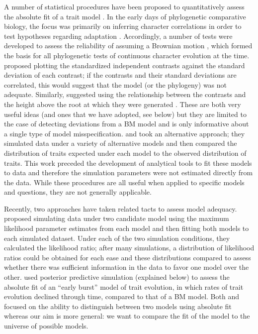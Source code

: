 \documentclass[a4paper,11pt]{article}
\begin{document}
A number of statistical procedures have been proposed to quantitatively assess the absolute fit of a trait model \citep[e.g.,][]{Garland1992, Garland1993, Purvis1995, Diaz1996, FreckletonHarvey2006, Boettiger2012, SlaterPennell, Beaulieu2013, Blackmon2014}. 
In the early days of phylogenetic comparative biology, the focus was primarily on inferring character correlations in order to test hypotheses regarding adaptation \citep[e.g.,][]{Felsenstein1985, Grafen1989, HarveyPagel1991}. Accordingly, a number of tests were developed to assess the reliability of assuming a Brownian motion \citep[BM;][]{Edwards1964, Felsenstein1973, Thompson1975}, which formed the basis for all phylogenetic tests of continuous character evolution at the time. \citet{Garland1992} proposed plotting the standardized independent contrasts \citep[\emph{sensu}][]{Felsenstein1985} against the standard deviation of each contrast; if the contrasts and their standard deviations are correlated, this would suggest that the model (or the phylogeny) was not adequate. Similarly, \citet{Purvis1995} suggested using the relationship between the contrasts and the height above the root at which they were generated \citep[see also][for a slight modification of this test]{FreckletonHarvey2006}. These are both very useful ideas (and ones that we have adopted, see below) but they are limited to the case of detecting deviations from a BM model and is only informative about a single type of model misspecification. \citet{Garland1993} and \citet{Diaz1996} took an alternative approach; they simulated data under a variety of alternative models and then compared the distribution of traits expected under each model to the observed distribution of traits. This work preceded the development of analytical tools to fit these models to data and therefore the simulation parameters were not estimated directly from the data. While these procedures are all useful when applied to specific models and questions, they are not generally applicable.

Recently, two approaches have taken related tacts to assess model adequacy. \citet{Boettiger2012} proposed simulating data under two candidate model using the maximum likelihood parameter estimates from each model and then fitting both models to each simulated dataset. Under each of the two simulation conditions, they calculated the likelihood ratio; after many simulations, a distribution of likelihood ratios could be obtained for each ease and these distributions compared to assess whether there was sufficient information in the data to favor one model over the other. \citet{SlaterPennell} used posterior predictive simulation (explained below) to assess the absolute fit of an ``early burst'' model of trait evolution, in which rates of trait evolution declined through time, compared to that of a BM model. Both \citet{Boettiger2012} and \citet{SlaterPennell} focused on the ability to distinguish between two models using absolute fit whereas our aim is more general: we want to compare the fit of the model to the universe of possible models. 
\end{document}
